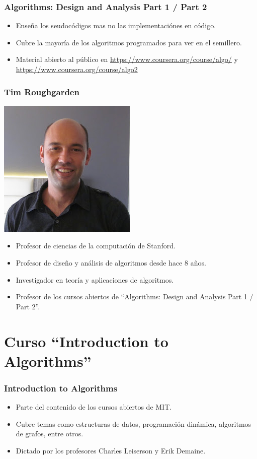 \documentclass{beamer}
\begin{document}
	\begin{frame}
		\frametitle{Algorithms: Design and Analysis Part 1 / Part 2}
		\begin{itemize}
			\item Enseña los seudocódigos mas no las implementaciónes en código.
			\item Cubre la mayoría de los algoritmos programados para ver en el semillero.
			\item Material abierto al público en \url{https://www.coursera.org/course/algo/} y \url{https://www.coursera.org/course/algo2}
		\end{itemize}	
	\end{frame}
	
	\begin{frame}
		\frametitle{Tim Roughgarden}
		\begin{center} \includegraphics[height = 0.25\textheight]{Tim.jpg} \end{center}
		\begin{itemize}
			\item Profesor de ciencias de la computación de Stanford.
			\item Profesor de diseño y análisis de algoritmos desde hace 8 años.
			\item Investigador en teoría y aplicaciones de algoritmos.
			\item Profesor de los cursos abiertos de ``Algorithms: Design and Analysis Part 1 / Part 2''. 
		\end{itemize}
	\end{frame}
	


\section[Curso MIT]{Curso ``Introduction to Algorithms''}
	\begin{frame}
		\frametitle{Introduction to Algorithms}
		\begin{itemize}
			\item Parte del contenido de los cursos abiertos de MIT.
			\item Cubre temas como estructuras de datos, programación dinámica, algoritmos de grafos, entre otros.
			\item Dictado por los profesores Charles Leiserson y Erik Demaine.
		\end{itemize}
	\end{frame}
	
\end{document}
